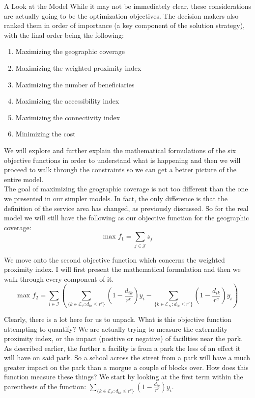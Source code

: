 \documentclass[12pt]{pom_thesis}
\theoremstyle{definition}
\begin{document}
\begin{chapter}{A Look at the Model}
While it may not be immediately clear, these considerations are actually going to be the optimization objectives. The decision makers also ranked them in order of importance (a key component of the solution strategy), with the final order being the following:
\begin{enumerate}
\item Maximizing the geographic coverage
\item Maximizing the weighted proximity index
\item Maximizing the number of beneficiaries
\item Maximizing the accessibility index
\item Maximizing the connectivity index
\item Minimizing the cost
\end{enumerate}
We will explore and further explain the mathematical formulations of the six objective functions in order to understand what is happening and then we will proceed to walk through the constraints so we can get a better picture of the entire model. \\

The goal of maximizing the geographic coverage is not too different than the one we presented in our simpler models. In fact, the only difference is that the definition of the service area has changed, as previously discussed. So for the real model we will still have the following as our objective function for the geographic coverage: 
\begin{equation} \label{objective-1}
\textrm{max } f_1 = \sum_{j \in \mathcal{J}} z_j
\end{equation}

We move onto the second objective function which concerns the weighted proximity index. I will first present the mathematical formulation and then we walk through every component of it.
\begin{equation} \label{objective-2}
\textrm{max } f_2 = \sum_{i \in \mathcal{I}}  \left( \sum_{\{k \in \mathcal{E_P}: d_{ik} \leq r^e  \}} \left( 1-\frac{d_{ik}}{r^e} \right) y_i  -   \sum_{\{k \in \mathcal{E_N}: d_{ik} \leq r^e  \}} \left( 1-\frac{d_{ik}}{r^e} \right) y_i   \right)
\end{equation}

Clearly, there is a lot here for us to unpack. What is this objective function attempting to quantify? We are actually trying to measure the externality proximity index, or the impact (positive or negative) of facilities near the park. As described earlier, the further a facility is from a park the less of an effect it will have on said park. So a school across the street from a park will have a much greater impact on the park than a morgue a couple of blocks over. How does this function measure these things? We start by looking at the first term within the parenthesis of the function: $\sum_{\{k \in \mathcal{E_P}: d_{ik} \leq r^e  \}} \left( 1-\frac{d_{ik}}{r^e} \right) y_i$. 


\end{chapter}
\end{document}
